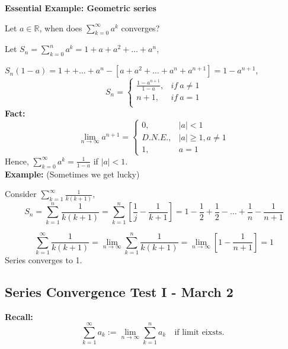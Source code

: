 \documentclass[12pt]{article}
\theoremstyle{plain}
\newcommand{\abs}[1]{\left| #1 \right|}
\newcommand{\mR}{{\mathbb{R}}}
\begin{document}
{\color{Brown}
\textbf{Essential Example: Geometric series}

Let $a \in \mR$, when does $\sum_{k=0}^{\infty} a^k$ converges? 

Let $S_n = \sum_{k=0}^n a^k = 1 + a + a^2 + \ldots + a^n$, 

$S_n(1-a) = 1+ + \ldots + a^n - [a+a^2 + \ldots + a^n + a^{n+1}] 
= 1-a^{n+1}$, 
\[
	S_n = 
	\begin{cases}
		\frac{1-a^{n+1}}{1-a}, & if \ a\neq 1\\
		n+1, & if \ a = 1\\
	\end{cases}
\]
\textbf{Fact:} 
\[
	\lim_{n\to\infty} a^{n+1} 
	= 
	\begin{cases}
	0, & \abs{a}<1\\
	D.N.E., & \abs{a} \geq 1, a \neq 1\\
	1, & a = 1
	\end{cases}
\]
Hence, $\sum_{k=0}^{\infty} a^k = \frac1{1-a}$ if $\abs a < 1$. \\

\textbf{Example: } (Sometimes we get lucky)

Consider $\sum_{k=1}^{\infty} \frac1{k(k+1)}$, 
\[
	S_n = \sum_{k=1}^n \frac1{k(k+1)} = \sum_{k=1}^n [\frac 1j - \frac1{k+1}]
	= 1 - \frac 12 + \frac 12 - \ldots + \frac 1n - \frac1{n+1}
\]

\[
	\sum_{k=1}^{\infty} \frac1{k(k+1)} 
	=\lim_{n\to\infty} \sum_{k=1}^n \frac1{k(k+1)} 
	= \lim_{n\to\infty} [1-\frac1{n+1}] = 1
\]
Series converges to 1. 

}




\newpage
\subsection{Series Convergence Test I - March 2}

\textbf{Recall: }
\[
	\sum_{k=1}^{\infty} a_k := \lim_{n\to\infty} \sum_{k=1}^n a_k
	\quad \text{if limit eixsts. }
\]
\end{document}
